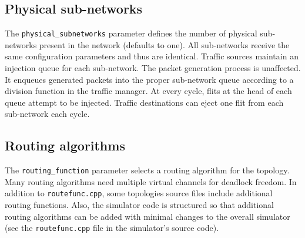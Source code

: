 \documentclass[11pt]{article}
\begin{document}
\subsection{Physical sub-networks}
\label{sec:physical_subnets}

The \texttt{physical\_subnetworks} parameter defines the number of
physical sub-networks present in the network (defaults to one). All
sub-networks receive the same configuration parameters and thus are
identical. Traffic sources maintain an injection queue for each
sub-network. The packet 
generation process is unaffected. It enqueues generated packets into
the proper sub-network queue according to a division function in the
traffic manager. At every cycle, flits at the head of each queue
attempt to be injected. Traffic destinations can eject one flit from
each sub-network each cycle. 


\subsection{Routing algorithms}
\label{sec:routing_algs}

The \texttt{routing\_function} parameter selects a routing algorithm
for the topology.  Many routing algorithms need multiple virtual
channels for deadlock freedom. In addition to \texttt{routefunc.cpp},
some topologies source files include additional routing
functions. Also, the simulator code is structured so that additional
routing algorithms can be added with minimal changes to the overall
simulator (see the \texttt{routefunc.cpp} file in the simulator's
source code). 
\end{document}
